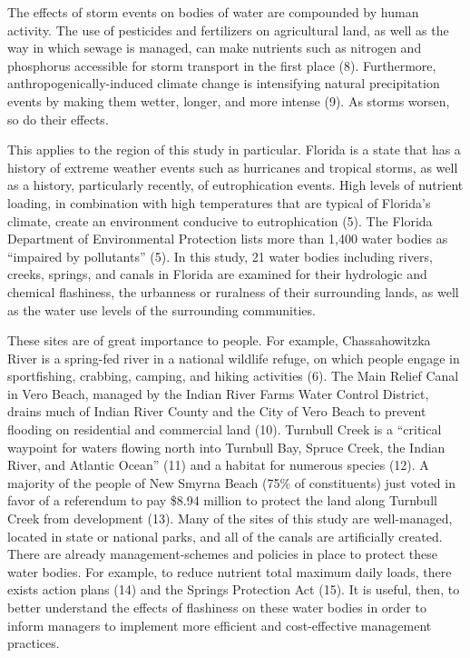 \documentclass[12pt,]{article}
\begin{document}
The effects of storm events on bodies of water are compounded by human
activity. The use of pesticides and fertilizers on agricultural land, as
well as the way in which sewage is managed, can make nutrients such as
nitrogen and phosphorus accessible for storm transport in the first
place (8). Furthermore, anthropogenically-induced climate change is
intensifying natural precipitation events by making them wetter, longer,
and more intense (9). As storms worsen, so do their effects.

This applies to the region of this study in particular. Florida is a
state that has a history of extreme weather events such as hurricanes
and tropical storms, as well as a history, particularly recently, of
eutrophication events. High levels of nutrient loading, in combination
with high temperatures that are typical of Florida's climate, create an
environment conducive to eutrophication (5). The Florida Department of
Environmental Protection lists more than 1,400 water bodies as
``impaired by pollutants'' (5). In this study, 21 water bodies including
rivers, creeks, springs, and canals in Florida are examined for their
hydrologic and chemical flashiness, the urbanness or ruralness of their
surrounding lands, as well as the water use levels of the surrounding
communities.

These sites are of great importance to people. For example,
Chassahowitzka River is a spring-fed river in a national wildlife
refuge, on which people engage in sportfishing, crabbing, camping, and
hiking activities (6). The Main Relief Canal in Vero Beach, managed by
the Indian River Farms Water Control District, drains much of Indian
River County and the City of Vero Beach to prevent flooding on
residential and commercial land (10). Turnbull Creek is a ``critical
waypoint for waters flowing north into Turnbull Bay, Spruce Creek, the
Indian River, and Atlantic Ocean'' (11) and a habitat for numerous
species (12). A majority of the people of New Smyrna Beach (75\% of
constituents) just voted in favor of a referendum to pay \$8.94 million
to protect the land along Turnbull Creek from development (13). Many of
the sites of this study are well-managed, located in state or national
parks, and all of the canals are artificially created. There are already
management-schemes and policies in place to protect these water bodies.
For example, to reduce nutrient total maximum daily loads, there exists
action plans (14) and the Springs Protection Act (15). It is useful,
then, to better understand the effects of flashiness on these water
bodies in order to inform managers to implement more efficient and
cost-effective management practices.
\end{document}

